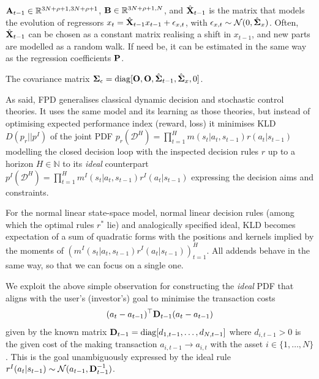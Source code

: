$\mathbf{A}_{t-1} \in \mathbb{R}^{3N+\rho+1, 3N+\rho+1}$, $\mathbf{B}\in\mathbb{R}^{3N+\rho+1, N}$, and $\hat{\mathbf{X}}_{t-1}$ is the matrix that models the evolution of regressors $x_{t}=\hat{\mathbf{X}}_{t-1}x_{t-1}+\epsilon_{x,t}$, with $\epsilon_{x,t}\sim \mathcal{N}(0,\hat{\mathbf{\Sigma}}_{x})$. Often, $\hat{\mathbf{X}}_{t-1}$ can be chosen as a constant matrix realising a shift in $x_{t-1}$, and new parts are modelled as a random walk. If need be, it can be estimated in the same way as the regression coefficients $\mathbf{P}$.

The covariance matrix $\mathbf{\Sigma}_{\epsilon} = \mathrm{diag}[\mathbf{O},\mathbf{O},\hat{\mathbf{\Sigma}}_{t-1},\hat{\mathbf{\Sigma}}_{x},0]$.

As said, FPD generalises classical dynamic decision and stochastic control theories. It uses the same model and its learning as those theories, but instead of optimising expected performance index (reward, loss) it minimises KLD $D(p_{r}||p^{I})$ of the joint PDF $p_{r}(\mathcal{D}^{H})=\prod_{t=1}^{H}m(s_{t}|a_{t},s_{t-1})r(a_{t}|s_{t-1})$ modelling the closed decision loop with the inspected decision rules $r$ up to a horizon $H\in \mathbb{N}$ to its \emph{ideal} counterpart $p^{I}(\mathcal{D}^{H})=\prod_{t=1}^{H}m^{I}(s_{t}|a_{t},s_{t-1})r^{I}(a_{t}|s_{t-1})$ expressing the decision aims and constraints.

For the normal linear state-space model, normal linear decision rules (among which the optimal rules $r^{\ast}$ lie) and analogically specified ideal, KLD becomes expectation of a sum of quadratic forms with the positions and kernels implied by the moments of $(m^{I}(s_{t}|a_{t},s_{t-1})r^{I}(a_{t}|s_{t-1}))_{t=1}^{H}$. All addends behave in the same way, so that we can focus on a single one.

We exploit the above simple observation for constructing the \emph{ideal} PDF that aligns with the user's (investor's) goal to minimise the transaction costs
\begin{equation}
\nonumber
(a_{t}-a_{t-1})^{\top}\mathbf{D}_{t-1}(a_{t}-a_{t-1})
\end{equation}
 given by the known matrix $\mathbf{D}_{t-1}=\mathrm{diag}[d_{1,t-1},\ldots,d_{N,t-1}]$ where $d_{i,t-1}>0$ is the given cost of the making transaction $a_{i,t-1}\rightarrow a_{i,t}$ with the asset $i\in\{1,\ldots,N\}$. This is the goal unambiguously expressed by the ideal rule $r^I(a_{t}|s_{t-1}) \sim \mathcal{N}(a_{t-1}, \mathbf{D}^{-1}_{t-1})$.

